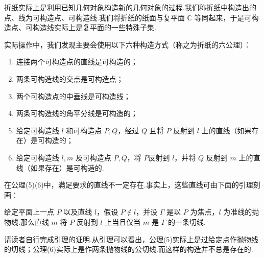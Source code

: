 折纸实际上是利用已知几何对象构造新的几何对象的过程.我们称折纸中构造出的点、线为可构造点、可构造线.我们将折纸的纸面与复平面 $\mathbb{C}$ 等同起来，于是可构造点、可构造线实际上是复平面的一些特殊子集.

实际操作中，我们发现主要会使用以下六种构造方式（称之为折纸的六公理）：

\begin{enumerate}[wide,itemindent=2em,label=(\arabic*)]
    \item 连接两个可构造点的直线是可构造的；
    \item 两条可构造线的交点是可构造点；
    \item 两个可构造点的中垂线是可构造线；
    \item 两条可构造线的角平分线是可构造的；
    \item 给定可构造线 $l$ 和可构造点 $P,Q$，经过 $Q$ 且将 $P$ 反射到 $l$ 上的直线（如果存在）是可构造的；
    \item 给定可构造线 $l,m$ 及可构造点 $P,Q$，将 $P$反射到 $l$，并将 $Q$ 反射到 $m$ 上的直线（如果存在）是可构造的.
\end{enumerate}

在公理(5)(6)中，满足要求的直线不一定存在.事实上，这些直线可由下面的引理刻画：

\begin{lemma}
    给定平面上一点 $P$ 以及直线 $l$，假设 $P \notin l$，并设 $\Gamma$ 是以 $P$ 为焦点，$l$ 为准线的抛物线.那么直线 $m$ 将 $P$ 反射到 $l$ 上当且仅当 $m$ 是 $\Gamma$ 的一条切线.
\end{lemma}

请读者自行完成引理的证明.从引理可以看出，公理(5)实际上是过给定点作抛物线的切线；公理(6)实际上是作两条抛物线的公切线.而这样的构造并不总是存在的.